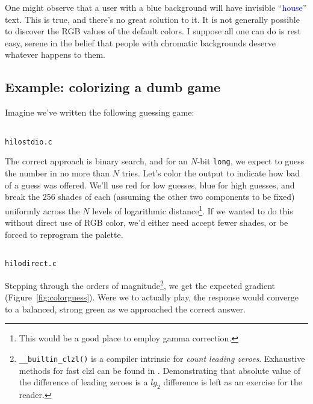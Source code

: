 \documentclass[letterpaper,10pt]{article}
\begin{document}
One might observe that a user with a blue background will have invisible
``\textcolor{blue}{house}'' text. This is true, and there's no great solution
to it. It is not generally possible to discover the RGB values of the default
colors. I suppose all one can do is rest easy, serene in the belief that people
with chromatic backgrounds deserve whatever happens to them.

\subsection{Example: colorizing a dumb game}

Imagine we've written the following guessing game:

\begin{listing}[!htbp]
\inputminted[]{C}{code/hilostdio.c}
\caption{\texttt{hilostdio.c}}
\end{listing}

The correct approach is binary search, and for an $N$-bit \texttt{long}, we expect to
guess the number in no more than $N$ tries. Let's color the output to indicate how
bad of a guess was offered. We'll use red for low guesses, blue for high
guesses, and break the 256 shades of each (assuming the other two components
to be fixed) uniformly across the $N$ levels of logarithmic
distance\footnote{This would be a good place to employ \gls{gamma correction}.}.
If we wanted to do this without direct use of RGB color, we'd either need
accept fewer shades, or be forced to reprogram the palette.

\begin{listing}[!htbp]
\inputminted[]{C}{code/hilodirect.c}
\caption{\texttt{hilodirect.c}}
\end{listing}

Stepping through the orders of magnitude\footnote{\texttt{\_\_builtin\_clzl()}
is a compiler intrinsic for \textit{count leading zeroes}. Exhaustive methods
for fast clzl can be found in \cite{hackerdelight}. Demonstrating that
absolute value of the difference of leading zeroes is a $lg_{2}$ difference
is left as an exercise for the reader.}, we get the expected gradient
(Figure~\ref{fig:colorguess}). Were we to actually play, the response would
converge to a balanced, strong green as we approached the correct answer.
\end{document}
